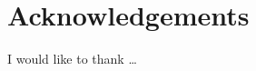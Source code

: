 \chapter*{Acknowledgements}
\thispagestyle{empty}

\vspace*{2cm}
I would like to thank \ldots

\clearpage

